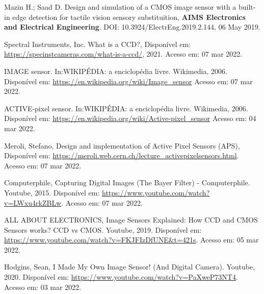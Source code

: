 \documentclass[10pt,a4paper,twocolumn]{article}
\begin{document}
	\begin{thebibliography}{99}
		{Mazin H.; Saad D. {Design and simulation of a CMOS image sensor with a built-in edge detection for tactile vision sensory substituition}, \textbf{AIMS Electronics and Electrical Engineering}. DOI: 10.3924/ElectrEng.2019.2.144, 06 May 2019.}
		
		{Spectral Instruments, Inc. {What is a CCD?}, Disponível em: \url{https://specinstcameras.com/what-is-a-ccd/}, 2021. Acesso em: 07 mar 2022.}
		
		{IMAGE sensor. In:WIKIPÉDIA: a enciclopédia livre. Wikimedia, 2006. Disponível em: \url{https://en.wikipedia.org/wiki/Image_sensor} Acesso em: 07 mar 2022.}

		{ACTIVE-pixel sensor. In:WIKIPÉDIA: a enciclopédia livre. Wikimedia, 2006. Disponível em: \url{https://en.wikipedia.org/wiki/Active-pixel_sensor} Acesso em: 04 mar 2022.}
		
		{Meroli, Stefano, {Design and implementation of Active Pixel Sensors (APS)}, Disponível em: \url{https://meroli.web.cern.ch/lecture_activepixelsensors.html}. Acesso em: 07 mar 2022.}
		
		{Computerphile, {Capturing Digital Images (The Bayer Filter) - Computerphile}. Youtube, 2015. Disponível em: \url{https://www.youtube.com/watch?v=LWxu4rkZBLw}. Acesso em: 07 mar 2022.}
		
		{ALL ABOUT ELECTRONICS, {Image Sensors Explained: How CCD and CMOS Sensors works? CCD vs CMOS}. Youtube, 2019. Disponível em: \url{https://www.youtube.com/watch?v=FKJFIzDfUNE&t=421s}. Acesso em: 05 mar 2022.}
		
		{Hodgins, Sean, {I Made My Own Image Sensor! (And Digital Camera)}. Youtube, 2020. Disponível em: \url{https://www.youtube.com/watch?v=PaXweP73NT4}. Acesso em: 03 mar 2022.}

	\end{thebibliography}
\end{document}
